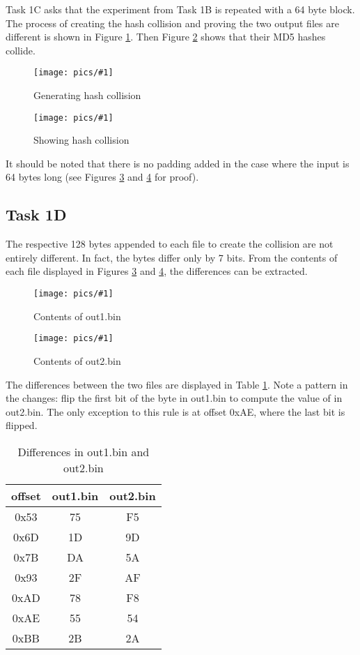 \documentclass[11pt]{article}
\newcommand{\fig}[2]{ 
\begin{figure}[h]
	\centering
	\caption{#2}
	\texttt{[image: pics/\#1]}
	\label{fig:#1}
\end{figure} 
}
\begin{document}
Task 1C asks that the experiment from Task 1B is repeated with a 64 byte block. The process of creating the hash collision and proving the two output files are different is shown in Figure \ref{fig:task1.c.1}. Then Figure \ref{fig:task1.c.2} shows that their MD5 hashes collide.

\fig{task1.c.1}{Generating hash collision}

\fig{task1.c.2}{Showing hash collision}

It should be noted that there is no padding added in the case where the input is 64 bytes long (see Figures \ref{fig:task1.d.1} and \ref{fig:task1.d.2} for proof).

\subsection*{Task 1D}

The respective 128 bytes appended to each file to create the collision are not entirely different. In fact, the bytes differ only by 7 bits. From the contents of each file displayed in Figures \ref{fig:task1.d.1} and \ref{fig:task1.d.2}, the differences can be extracted.

\fig{task1.d.1}{Contents of out1.bin}

\fig{task1.d.2}{Contents of out2.bin}

\newpage
The differences between the two files are displayed in Table \ref{tab:task1.d.1}. Note a pattern in the changes: flip the first bit of the byte in out1.bin to compute the value of in out2.bin. The only exception to this rule is at offset 0xAE, where the last bit is flipped.

\begin{table}[h]
	\centering
	\caption{Differences in out1.bin and out2.bin}
	\begin{tabular}{|c||c|c|}
		\hline
		offset & out1.bin & out2.bin \\
		\hline
		0x53 & 75 & F5 \\
		\hline
		0x6D & 1D & 9D \\
		\hline
		0x7B & DA & 5A \\
		\hline
		0x93 & 2F & AF \\
		\hline
		0xAD & 78 & F8 \\
		\hline
		0xAE & 55 & 54 \\
		\hline
		0xBB & 2B & 2A \\
		\hline
	\end{tabular}
	\label{tab:task1.d.1}
\end{table}
\end{document}
